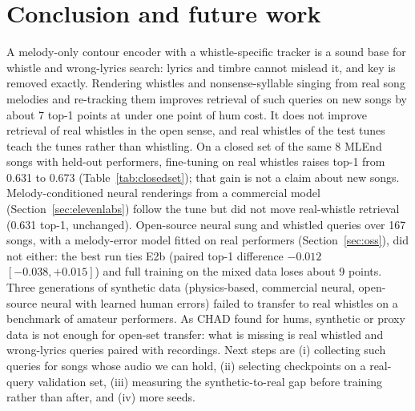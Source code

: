 \documentclass[11pt]{article}
\begin{document}
\section{Conclusion and future work}
A melody-only contour encoder with a whistle-specific tracker is a sound base for whistle and wrong-lyrics search: lyrics and timbre cannot mislead it, and key is removed exactly. Rendering whistles and nonsense-syllable singing from real song melodies and re-tracking them improves retrieval of such queries on new songs by about 7 top-1 points at under one point of hum cost. It does not improve retrieval of real whistles in the open sense, and real whistles of the test tunes teach the tunes rather than whistling. On a closed set of the same 8 MLEnd songs with held-out performers, fine-tuning on real whistles raises top-1 from 0.631 to 0.673 (Table~\ref{tab:closedset}); that gain is not a claim about new songs. Melody-conditioned neural renderings from a commercial model (Section~\ref{sec:elevenlabs}) follow the tune but did not move real-whistle retrieval (0.631 top-1, unchanged). Open-source neural sung and whistled queries over 167 songs, with a melody-error model fitted on real performers (Section~\ref{sec:oss}), did not either: the best run ties E2b (paired top-1 difference $-0.012$ $[-0.038, +0.015]$) and full training on the mixed data loses about 9 points. Three generations of synthetic data (physics-based, commercial neural, open-source neural with learned human errors) failed to transfer to real whistles on a benchmark of amateur performers. As CHAD found for hums, synthetic or proxy data is not enough for open-set transfer: what is missing is real whistled and wrong-lyrics queries paired with recordings. Next steps are (i) collecting such queries for songs whose audio we can hold, (ii) selecting checkpoints on a real-query validation set, (iii) measuring the synthetic-to-real gap before training rather than after, and (iv) more seeds.




\end{document}
